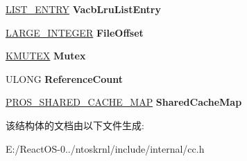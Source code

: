 \begin{DoxyCompactItemize}
\mbox{\label{struct___r_o_s___v_a_c_b_af10c7066eb8bf71405d9765868f8c974}} 
\hyperlink{struct___l_i_s_t___e_n_t_r_y}{L\+I\+S\+T\+\_\+\+E\+N\+T\+RY} {\bfseries Vacb\+Lru\+List\+Entry}
\item 
\mbox{\label{struct___r_o_s___v_a_c_b_a4eb86c10097fa49ee330148fb964a368}} 
\hyperlink{union___l_a_r_g_e___i_n_t_e_g_e_r}{L\+A\+R\+G\+E\+\_\+\+I\+N\+T\+E\+G\+ER} {\bfseries File\+Offset}
\item 
\mbox{\label{struct___r_o_s___v_a_c_b_a5d61c40207190cbb6f017bb2ba49523d}} 
\hyperlink{struct___k_m_u_t_a_n_t}{K\+M\+U\+T\+EX} {\bfseries Mutex}
\item 
\mbox{\label{struct___r_o_s___v_a_c_b_a3c63bc091791a7fc95fc33a190b52b8b}} 
U\+L\+O\+NG {\bfseries Reference\+Count}
\item 
\mbox{\label{struct___r_o_s___v_a_c_b_a26000a6be9330ad8717d44fb06ee984e}} 
\hyperlink{struct___r_o_s___s_h_a_r_e_d___c_a_c_h_e___m_a_p}{P\+R\+O\+S\+\_\+\+S\+H\+A\+R\+E\+D\+\_\+\+C\+A\+C\+H\+E\+\_\+\+M\+AP} {\bfseries Shared\+Cache\+Map}
\end{DoxyCompactItemize}


该结构体的文档由以下文件生成\+:\begin{DoxyCompactItemize}
\item 
E\+:/\+React\+O\+S-\/0../ntoskrnl/include/internal/cc.\+h\end{DoxyCompactItemize}
